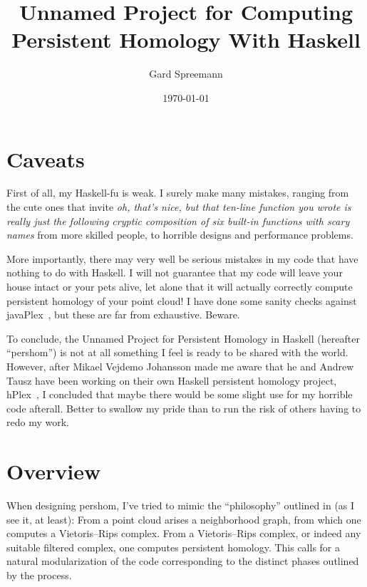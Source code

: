 \documentclass[a4paper,10pt]{article}
\title{Unnamed Project for Computing Persistent Homology With Haskell}
\author{Gard Spreemann}
\date{\today}
\begin{document}
\maketitle

\section*{Caveats}
First of all, my Haskell-fu is weak. I surely make many mistakes,
ranging from the cute ones that invite \emph{oh, that's nice, but that
  ten-line function you wrote is really just the following cryptic
  composition of six built-in functions with scary names} from more
skilled people, to horrible designs and performance problems.

More importantly, there may very well be serious mistakes in my code
that have nothing to do with Haskell. I will not guarantee that my
code will leave your house intact or your pets alive, let alone that
it will actually correctly compute persistent homology of your point
cloud! I have done some sanity checks against
javaPlex~\citep{javaplex}, but these are far from exhaustive. Beware.

To conclude, the Unnamed Project for Persistent Homology in Haskell
(hereafter ``pershom'') is not at all something I feel is ready to be
shared with the world. However, after Mikael Vejdemo Johansson made me
aware that he and Andrew Tausz have been working on their own Haskell
persistent homology project, hPlex~\citep{hplex}, I concluded that
maybe there would be some slight use for my horrible code
afterall. Better to swallow my pride than to run the risk of others
having to redo my work.

\section{Overview}
When designing pershom, I've tried to mimic the ``philosophy''
outlined in \citep{compph,fcvr} (as I see it, at least): From a point
cloud arises a neighborhood graph, from which one computes a
Vietoris--Rips complex. From a Vietoris--Rips complex, or indeed any
suitable filtered complex, one computes persistent homology. This
calls for a natural modularization of the code corresponding to the
distinct phases outlined by the process.
\end{document}
